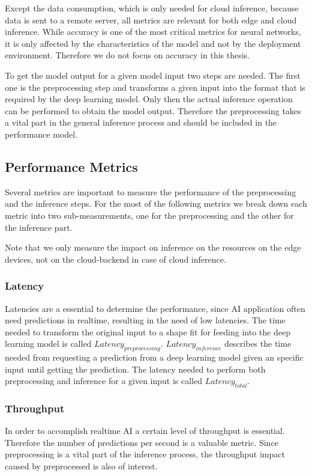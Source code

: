 Except the data consumption, which is only needed for cloud inference, because data is sent to a remote server, all metrics are relevant for both edge and cloud inference.
While accuracy is one of the most critical metrics for neural networks, it is only affected by the characteristics of the model and not by the deployment environment. Therefore we do not focus on accuracy in this thesis.

To get the model output for a given model input two steps are needed. The first one is the preprocessing step and transforms a given input into the format that is required by the deep learning model. Only then the actual inference operation can be performed to obtain the model output. Therefore the preprocessing takes a vital part in the general inference process and should be included in the performance model.

\subsection{Performance Metrics}
\label{chap:metrics}
Several metrics are important to measure the performance of the preprocessing and the inference steps. For the most of the following metrics we break down each metric into two sub-measurements, one for the preprocessing  and the other for the inference part.

Note that we only measure the impact on inference on the resources on the edge devices, not on the cloud-backend in case of cloud inference.
\subsubsection{Latency}
Latencies are a essential to determine the performance, since AI application often need predictions in realtime, resulting in the need of low latencies.
The time needed to transform the original input to a shape fit for feeding into the deep learning model is called $Latency_{preprocessing}$.
$Latency_{inference}$ describes the time needed from requesting a prediction from a deep learning model given an specific input until getting the prediction.
The latency needed to perform both preprocessing and inference for a given input is called $Latency_{total}$.
\subsubsection{Throughput}
In order to accomplish realtime AI a certain level of throughput is essential. Therefore the number of predictions per second is a valuable metric. 
Since preprocessing is a vital part of the inference process, the throughput impact caused by preprocessed is also of interest.


